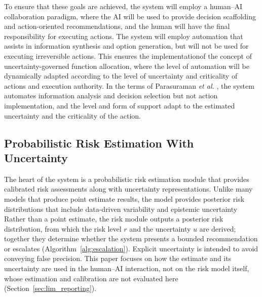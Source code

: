 \documentclass[journal]{IEEEtran}
\theoremstyle{plain}
\theoremstyle{definition}
\providecommand{\DIFaddtex}[1]{{\protect\color{blue} \sf #1}} %
\providecommand{\DIFdeltex}[1]{{\protect\color{red} \scriptsize #1}} %
\providecommand{\DIFaddbegin}{} %
\providecommand{\DIFaddend}{} %
\providecommand{\DIFdelbegin}{} %
\providecommand{\DIFdelend}{} %
\providecommand{\DIFadd}[1]{\texorpdfstring{\DIFaddtex{#1}}{#1}} %
\providecommand{\DIFdel}[1]{\texorpdfstring{\DIFdeltex{#1}}{}} %
\newcommand{\DIFscaledelfig}{0.5}
\newlength{\DIFdelgraphicswidth} %
\newlength{\DIFdelgraphicsheight} %
\newcommand{\DIFaddincludegraphics}[2][]{{\color{blue}\fbox{\DIFOincludegraphics[#1]{#2}}}} %
\newcommand{\DIFdelincludegraphics}[2][]{%
\sbox{\DIFdelgraphicsbox}{\DIFOincludegraphics[#1]{#2}}%
\settoboxwidth{\DIFdelgraphicswidth}{\DIFdelgraphicsbox} %
\settoboxtotalheight{\DIFdelgraphicsheight}{\DIFdelgraphicsbox} %
\scalebox{\DIFscaledelfig}{%
\parbox[b]{\DIFdelgraphicswidth}{\usebox{\DIFdelgraphicsbox}\\[-\baselineskip] \rule{\DIFdelgraphicswidth}{0em}}\llap{\resizebox{\DIFdelgraphicswidth}{\DIFdelgraphicsheight}{%
\setlength{\unitlength}{\DIFdelgraphicswidth}%
\begin{picture}(1,1)%
\thicklines\linethickness{2pt} %
{\color[rgb]{1,0,0}\put(0,0){\framebox(1,1){}}}%
{\color[rgb]{1,0,0}\put(0,0){\line( 1,1){1}}}%
{\color[rgb]{1,0,0}\put(0,1){\line(1,-1){1}}}%
\end{picture}%
}\hspace*{3pt}}} %
} %
\DeclareRobustCommand{\DIFaddbegin}{\DIFOaddbegin \let\includegraphics\DIFaddincludegraphics} %
\DeclareRobustCommand{\DIFaddend}{\DIFOaddend \let\includegraphics\DIFOincludegraphics} %
\DeclareRobustCommand{\DIFdelbegin}{\DIFOdelbegin \let\includegraphics\DIFdelincludegraphics} %
\DeclareRobustCommand{\DIFdelend}{\DIFOaddend \let\includegraphics\DIFOincludegraphics} %
\begin{document}
\DIFdel{To ensure that these goals are achieved, the system will employ a human--AI collaboration paradigm, where the AI will be used to provide decision scaffolding and action-oriented recommendations, and the human will have the final responsibility for executing actions. The system will employ automation that assists in information synthesis and option generation, but will not be used for executing irreversible actions. This ensures the implementationof the concept of uncertainty-governed function allocation, where the level of automation will be dynamically adapted according to the level of uncertainty and criticality of actions}\DIFdelend \DIFaddbegin \DIFadd{and execution authority. In the terms of Parasuraman \emph{et al.} \cite{Parasuraman2000LOA}, the system automates information analysis and decision selection but not action implementation, and the level and form of support adapt to the estimated uncertainty and the criticality of the action}\DIFaddend .

    \subsection{Probabilistic Risk Estimation With Uncertainty}
    \DIFdelbegin \DIFdel{The heart of the system is a probabilistic risk estimation module that provides calibrated risk assessments along with uncertainty representations. Unlike many models that produce point estimate results, the model provides posterior risk distributions that include data-driven variability and epistemic uncertainty}\DIFdelend \DIFaddbegin \label{sec:risk}
    \DIFadd{Rather than a point estimate, the risk module outputs a posterior risk distribution, from which the risk level $r$ and the uncertainty $u$ are derived; together they determine whether the system presents a bounded recommendation or escalates (Algorithm~\ref{alg:escalation}). Explicit uncertainty is intended to avoid conveying false precision. This paper focuses on how the estimate and its uncertainty are used in the human--AI interaction, not on the risk model itself, whose estimation and calibration are not evaluated here (Section~\ref{sec:lim_reporting})}\DIFaddend .
\end{document}
